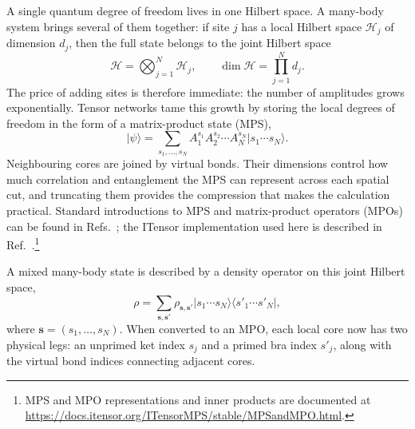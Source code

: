A single quantum degree of freedom lives in one Hilbert space.
A many-body system brings several of them together: if site \(j\) has a local Hilbert space \(\mathcal H_j\) of dimension \(d_j\), then the full state belongs to the joint Hilbert space
%
\begin{equation}
    \mathcal H
    = \bigotimes_{j=1}^{N}\mathcal H_j, \qquad \dim\mathcal H=\prod_{j=1}^{N}d_j.
    \label{eq:many-body-hilbert-space}
\end{equation}
%
The price of adding sites is therefore immediate: the number of amplitudes grows exponentially.
Tensor networks tame this growth by storing the local degrees of freedom in the form of a matrix-product state (MPS),
%
\begin{equation}
    \lvert\psi\rangle
    = \sum_{s_1,\ldots,s_N}
    A_1^{s_1}A_2^{s_2}\cdots A_N^{s_N} \lvert s_1\cdots s_N\rangle.
    \label{eq:many-body-mps}
\end{equation}
%
Neighbouring cores are joined by virtual bonds.
Their dimensions control how much correlation and entanglement the MPS can represent across each spatial cut, and truncating them provides the compression that makes the calculation practical.
Standard introductions to MPS and matrix-product operators (MPOs) can be found in Refs.~\cite{Schollwock2011,Orus2014}; the ITensor implementation used here is described in Ref.~\cite{Fishman2022}.\footnote{MPS and MPO representations and inner products are documented at \url{https://docs.itensor.org/ITensorMPS/stable/MPSandMPO.html}.}

A mixed many-body state is described by a density operator on this joint Hilbert space,
%
\begin{equation}
    \rho
    = \sum_{\boldsymbol{s},\boldsymbol{s}'} \rho_{\boldsymbol{s},\boldsymbol{s}'} \lvert s_1\cdots s_N\rangle \langle s'_1\cdots s'_N\rvert,
    \label{eq:many-body-density-operator}
\end{equation}
%
where \(\boldsymbol{s}=(s_1,\ldots,s_N)\).
When converted to an MPO, each local core now has two physical legs: an unprimed ket index \(s_j\) and a primed bra index \(s'_j\), along with the virtual bond indices connecting adjacent cores.

